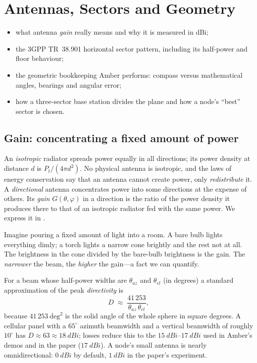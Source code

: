 \chapter{Antennas, Sectors and Geometry}
\label{ch:antennas}

\begin{defbox}
\begin{itemize}
 \item what antenna \emph{gain} really means and why it is measured in dBi;
 \item the 3GPP TR~38.901 horizontal sector pattern, including its half-power and floor behaviour;
 \item the geometric bookkeeping Amber performs: compass versus mathematical angles, bearings and angular error;
 \item how a three-sector base station divides the plane and how a node's ``best'' sector is chosen.
\end{itemize}
\end{defbox}

\section{Gain: concentrating a fixed amount of power}
\label{sec:gain}

An \emph{isotropic} radiator spreads power equally in all directions; its power
density at distance $d$ is $P_t/(4\pi d^2)$. No physical antenna is isotropic,
and the laws of energy conservation say that an antenna cannot create power, only
\emph{redistribute} it. A \emph{directional} antenna concentrates power into some
directions at the expense of others. Its \emph{gain} $G(\theta,\varphi)$ in a
direction is the ratio of the power density it produces there to that of an
isotropic radiator fed with the same power. We express it in \si{\dBi}.

\begin{intuition}
Imagine pouring a fixed amount of light into a room. A bare bulb lights
everything dimly; a torch lights a narrow cone brightly and the rest not at all.
The brightness in the cone divided by the bare-bulb brightness is the gain. The
\emph{narrower} the beam, the \emph{higher} the gain---a fact we can quantify.
\end{intuition}

For a beam whose half-power widths are $\theta_{az}$ and $\theta_{el}$ (in
degrees) a standard approximation of the peak \emph{directivity} is
\begin{equation}
 D \;\approx\; \frac{41\,253}{\theta_{az}\,\theta_{el}},
\label{eq:directivity}
\end{equation}
because $41\,253\ \mathrm{deg}^2$ is the solid angle of the whole sphere in square
degrees. A cellular panel with a $65^\circ$ azimuth beamwidth and a vertical
beamwidth of roughly $10^\circ$ has $D\approx63\approx\SI{18}{dBi}$; losses
reduce this to the $\SI{15}{dBi}$--$\SI{17}{dBi}$ used in Amber's demos and in the
paper ($\SI{17}{dBi}$). A node's small antenna is nearly omnidirectional:
$\SI{0}{dBi}$ by default, $\SI{1}{dBi}$ in the paper's experiment.

